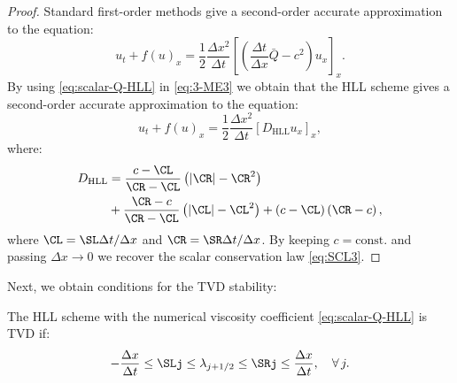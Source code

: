 \begin{proof}
Standard first-order methods give a second-order accurate approximation to the equation:
\begin{equation} \label{eq:3-ME3}
u_t + f(u)_x = \frac{1}{2} \frac{\Delta x^2}{\Delta t}\left[ \left( \frac{\Delta t}{\Delta x} \bar{Q} - c^2 \right) u_x \right]_x.
\end{equation}
By using \eqref{eq:scalar-Q-HLL} in \eqref{eq:3-ME3} we obtain that the HLL scheme gives a second-order accurate approximation to the equation:
\begin{equation} \label{eq:3-ME-HLL}
u_t + f(u)_x = \frac{1}{2} \frac{\Delta x^2}{\Delta t} \left[ D_{\text{HLL}} u_x \right]_x,
\end{equation}
where:
\begin{align}
D_{\text{HLL}} & = \frac{c - \CL}{\CR - \CL} \left( |\CR| - \CR^2 \right) \notag \\
& + \frac{\CR - c}{\CR - \CL} \left( |\CL|- \CL^2 \right) + \left( c - \CL \right) \left( \CR - c \right),
\end{align}
where $ \CL = \SL \Delta t / \Delta x $ and $ \CR = \SR \Delta t / \Delta x $. By keeping $ c = \text{const.} $ and passing $ \Delta x \rightarrow 0 $ we recover the scalar conservation law \eqref{eq:SCL3}.
\end{proof}

Next, we obtain conditions for the TVD stability:
\begin{lemma} \label{lemma:HLL-TVD}
The HLL scheme with the numerical viscosity coefficient \eqref{eq:scalar-Q-HLL} is TVD if:
\begin{equation} \label{eq:TVD-HLL-condition}
- \frac{\Delta x}{\Delta t} \leq
\SLj \leq 
\lambda_{j+1/2} \leq 
\SRj \leq
\frac{\Delta x}{\Delta t},
\quad \forall \, j.
\end{equation}
\end{lemma}

